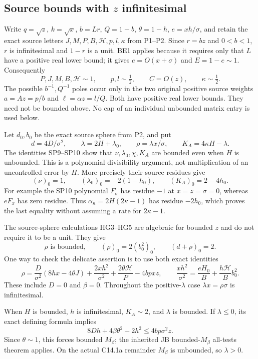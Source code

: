 \subsection{Source bounds with $z$ infinitesimal}

Write $q=\sqrt z$, $k=\sqrt x$, $b=Lr$, $Q=1-b$,
$\theta=1-h$, $e=xh/\sigma$, and retain the exact source letters
$J,M,P,B,\mathcal H,p,l,\kappa$ from P1--P2. Since $r=bz$ and
$0<b<1$, $r$ is infinitesimal and $1-r$ is a unit. BE1 applies
because it requires only that $L$ have a positive real lower bound;
it gives $e=O(x+\sigma)$ and $E=1-e\sim1$. Consequently
\[
 P,J,M,B,\mathcal H\sim1,\qquad
 p,l\sim\tfrac12,\qquad C=O(z),\qquad\kappa\sim\tfrac12.
 \tag{SF1}
\]
The possible $b^{-1},Q^{-1}$ poles occur only in the two original
positive source weights $a=Az=p/b$ and $\ell=\alpha z=l/Q$.
Both have positive real lower bounds. They need not be bounded above.
No cap of an individual unbounded matrix entry is used below.

Let $d_0,b_0$ be the exact source sphere from P2, and put
\[
 d=4D/\sigma^2,\qquad
 \lambda=2H+\lambda_0,\qquad
 \rho=\lambda x/\sigma,\qquad
 K_A=4\kappa H-\lambda.
 \tag{SF2}
\]
The identities SP9--SP10 show that $\nu,\lambda_0,\chi,K_A$ are
bounded even when $H$ is unbounded. This is a polynomial
divisibility argument, not multiplication of an uncontrolled error
by $H$. More precisely their source residues give
\[
 (\nu)_0=1,\qquad (\lambda_0)_0=-2(1-h_0),\qquad
 (K_A)_0=2-4h_0.
 \tag{SF3}
\]
For example the SP10 polynomial $F_\sigma$ has residue $-1$ at
$x=z=\sigma=0$, whereas $eF_x$ has zero residue. Thus
$\alpha_\kappa=2H(2\kappa-1)$ has residue $-2h_0$, which proves
the last equality without assuming a rate for $2\kappa-1$.

The source-sphere calculations HG3--HG5 are algebraic for bounded
$z$ and do not require it to be a unit. They give
\[
 \rho\text{ is bounded},\qquad
 (\rho)_0=2(b_0^2)_0,\qquad (d+\rho)_0=2.
 \tag{SF4}
\]
One way to check the delicate assertion is to use both exact identities
\[
 \rho=\frac D{\sigma^2}(8hx-4\theta J)
       +\frac{2xh^2}{\sigma^2}
       +\frac{2\theta\mathcal H}{P}-4bpxz,
 \qquad
 \frac{xh^2}{\sigma^2}=\frac{eH_0}{B}
                         +\frac{h\mathcal H}{B}b_0^2.
 \tag{SF5}
\]
These include $D=0$ and $\beta=0$. Throughout the positive-$\lambda$
case $\lambda x=\rho\sigma$ is infinitesimal.

When $H$ is bounded, $h$ is infinitesimal, $K_A\sim2$, and
$\lambda$ is bounded. If $\lambda\le0$, its exact defining formula
implies
\[
 8Dh+4\beta\theta^2+2h^2\le4bp\sigma^2z.
\]
Since $\theta\sim1$, this forces bounded $M_\beta$; the inherited
JB bounded-$M_\beta$ all-tests theorem applies. On the actual
C14.1a remainder $M_\beta$ is unbounded, so $\lambda>0$.

